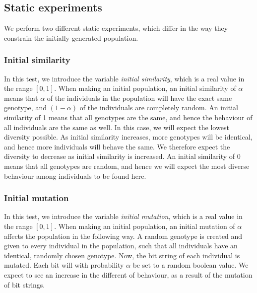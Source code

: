 \subsection{Static experiments}
We perform two different static experiments, which differ in the way they constrain the initially generated population. 

\subsubsection{Initial similarity}
In this test, we introduce the variable \emph{initial similarity}, which is a real value in the range $[0,1]$.
When making an initial population, an initial similarity of $\alpha$ means that $\alpha$ of the individuals in the population will have the exact same genotype, and $(1-\alpha)$ of the individuals are completely random.
An initial similarity of \num{1} means that all genotypes are the same, and hence the behaviour of all individuals are the same as well. In this case, we will expect the lowest diversity possible.
As initial similarity increases, more genotypes will be identical, and hence more individuals will behave the same.
We therefore expect the diversity to decrease as initial similarity is increased.
An initial similarity of \num{0} means that all genotypes are random, and hence we will expect the most diverse behaviour among individuals to be found here.

\subsubsection{Initial mutation}
In this test, we introduce the variable \emph{initial mutation}, which is a real value in the range $[0,1]$.
When making an initial population, an initial mutation of $\alpha$ affects the population in the following way.
A random genotype is created and given to every individual in the population, such that all individuals have an identical, randomly chosen genotype.
Now, the bit string of each individual is mutated. Each bit will with probability $\alpha$ be set to a random boolean value. 
We expect to see an increase in the different of behaviour, as a result of the mutation of bit strings. 

